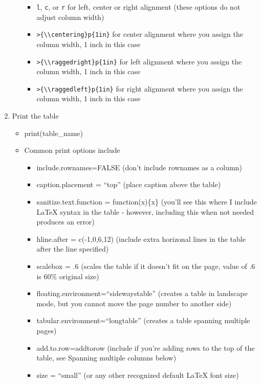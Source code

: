 \documentclass[12pt,]{article}
\providecommand{\tightlist}{%
  \setlength{\itemsep}{0pt}\setlength{\parskip}{0pt}}
\begin{document}
\begin{enumerate}
\begin{itemize}
    \begin{itemize}
    \tightlist
    \item
      \texttt{\textquotesingle{}l\textquotesingle{}},
      \texttt{\textquotesingle{}c\textquotesingle{}}, or
      \texttt{\textquotesingle{}r\textquotesingle{}} for left, center or
      right alignment (these options do not adjust column width)
    \item
      \texttt{\textquotesingle{}\textgreater{}\{\textbackslash{}\textbackslash{}centering\}p\{1in\}\textquotesingle{}}
      for center alignment where you assign the column width, 1 inch in
      this case
    \item
      \texttt{\textquotesingle{}\textgreater{}\{\textbackslash{}\textbackslash{}raggedright\}p\{1in\}\textquotesingle{}}
      for left alignment where you assign the column width, 1 inch in
      this case
    \item
      \texttt{\textquotesingle{}\textgreater{}\{\textbackslash{}\textbackslash{}raggedleft\}p\{1in\}\textquotesingle{}}
      for right alignment where you assign the column width, 1 inch in
      this case
    \end{itemize}
  \end{itemize}
\item
  Print the table

  \begin{itemize}
  \tightlist
  \item
    print(table\_name)
  \item
    Common print options include

    \begin{itemize}
    \tightlist
    \item
      include.rownames=FALSE (don't include rownames as a column)
    \item
      caption.placement = ``top'' (place caption above the table)
    \item
      sanitize.text.function = function(x)\{x\} (you'll see this where I
      include LaTeX syntax in the table - however, including this when
      not needed produces an error)
    \item
      hline.after = c(-1,0,6,12) (include extra horizonal lines in the
      table after the line specified)
    \item
      scalebox = .6 (scales the table if it doesn't fit on the page,
      value of .6 is 60\% original size)
    \item
      floating.environment=``sidewaystable'' (creates a table in
      landscape mode, but you cannot move the page number to another
      side)
    \item
      tabular.environment=``longtable'' (creates a table spanning
      multiple pages)
    \item
      add.to.row=addtorow (include if you're adding rows to the top of
      the table, see Spanning multiple columns below)
    \item
      size = ``small'' (or any other recognized default LaTeX font size)
    \end{itemize}
  \end{itemize}
\end{enumerate}
\end{document}
